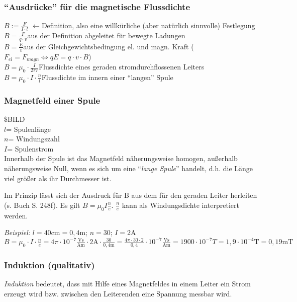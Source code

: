 \documentclass[a4paper]{scrartcl}
\begin{document}
\subsubsection{"`Ausdrücke"' für die magnetische Flussdichte}
\(B:=\frac{F}{I \cdot l}\) \(\leftarrow\)Definition, also eine willkürliche
(aber natürlich sinnvolle) Festlegung\\ %
\(B=\frac{F}{q \cdot v}\)aus der Definition abgeleitet für bewegte Ladungen\\
\(B=\frac{E}{v}\)aus der Gleichgewichtsbedingung el. und magn. Kraft
(\(F_{el}=F_{magn} \Longleftrightarrow qE=q \cdot v \cdot B\))\\
\(B=\mu_0 \cdot \frac{I}{2 \pi r}\)Flussdichte eines geraden stromdurchflossenen
Leiters\\
\(B=\mu_0 \cdot I \cdot \frac{n}{l}\)Flussdichte im innern einer
"`langen"' Spule

\subsubsection{Magnetfeld einer Spule}
\$BILD\\
\(l\)= Spulenlänge\\\(n\)= Windungszahl\\\(I\)= Spulenstrom\\
Innerhalb der Spule ist das Magnetfeld näherungsweise homogen, außerhalb
näherungsweise Null, wenn es sich um eine "`\emph{lange Spule}"' handelt, d.h.
die Länge viel größer als ihr Durchmesser ist.

Im Prinzip lässt sich der Ausdruck für B aus dem für den geraden Leiter
herleiten (s. Buch S. 248f). Es gilt \(B=\mu_0 I \frac{n}{e}\). \(\frac{n}{e}\)
kann als Windungsdichte interpretiert werden.

\emph{Beispiel:} \(l=40\mathrm{cm}=0,4\mathrm{m}\); \(n=30\);
\(I=2\mathrm{A}\)\\
\(B=\mu_0 \cdot I \cdot \frac{n}{e}=4 \pi \cdot 10^{-7}
\frac{\mathrm{Vs}}{\mathrm{Am}} \cdot 2\mathrm{A} \cdot
\frac{30}{0,4\mathrm{m}}=\frac{4 \pi \cdot 30 \cdot 2}{0,4} \cdot 10^{-7}
\frac{\mathrm{Vs}}{\mathrm{Am}}= 1900 \cdot 10^{-7} T = 1,9 \cdot 10^{-4}
\mathrm{T} = 0,19 \mathrm{mT}\)

\subsubsection{Induktion (qualitativ)}
\emph{Induktion} bedeutet, dass mit Hilfe eines Magnetfeldes in einem Leiter
ein Strom erzeugt wird bzw. zwischen den Leiterenden eine Spannung messbar wird.
\end{document}
